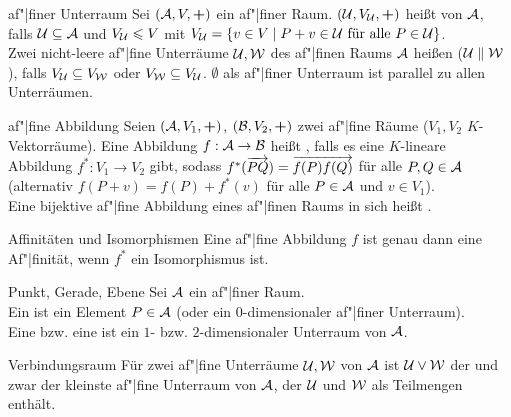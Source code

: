 \begin{Def}{af"|finer Unterraum}
    Sei $(\mathcal{A}, V, \boldsymbol{+})$ ein af"|finer Raum.
    $(\mathcal{U}, V_{\mathcal{U}}, \boldsymbol{+})$ heißt
     von $\mathcal{A}$, falls
    $\mathcal{U} \subseteq \mathcal{A}$ und $V_{\mathcal{U}} \leqslant V$ mit
    $V_{\mathcal{U}} = \{v \in V \;|\;
    P + v \in \mathcal{U} \text{ für alle } P \in \mathcal{U}\}$. \\
    Zwei nicht-leere af"|fine Unterräume $\mathcal{U}, \mathcal{W}$ des af"|finen 
    Raums $\mathcal{A}$ heißen 
    ($\mathcal{U} \parallel \mathcal{W}$),
    falls $V_{\mathcal{U}} \subseteq V_{\mathcal{W}}$ oder
    $V_{\mathcal{W}} \subseteq V_{\mathcal{U}}$.
    $\emptyset$ als af"|finer Unterraum ist parallel zu allen Unterräumen.
\end{Def}

\begin{Def}{af"|fine Abbildung}
    Seien $(\mathcal{A}, V_1, \boldsymbol{+})$,
    $(\mathcal{B}, V_2, \boldsymbol{+})$ zwei af"|fine Räume
    ($V_1, V_2$ $K$-Vektorräume).
    Eine Abbildung $f: \mathcal{A} \rightarrow \mathcal{B}$ heißt
    , falls es eine $K$-lineare Abbildung
    $f^\ast: V_1 \rightarrow V_2$ gibt,
    sodass $f^\ast(\overrightarrow{PQ}) = \overrightarrow{f(P) f(Q)}$ für alle
    $P, Q \in \mathcal{A}$ \\
    (alternativ $f(P + v) = f(P) + f^\ast(v)$ für alle
    $P \in \mathcal{A}$ und $v \in V_1$). \\
    Eine bijektive af"|fine Abbildung eines af"|finen Raums in sich heißt
    .
\end{Def}

\begin{Lemma}{Af{}finitäten und Isomorphismen}
    Eine af"|fine Abbildung $f$ ist genau dann eine Af"|finität, wenn
    $f^\ast$ ein Isomorphismus ist.
\end{Lemma}

\begin{Def}{Punkt, Gerade, Ebene}
    Sei $\mathcal{A}$ ein af"|finer Raum. \\
    Ein  ist ein Element $P \in \mathcal{A}$
    (oder ein $0$-dimensionaler af"|finer Unterraum). \\
    Eine  bzw. eine  ist ein $1$- bzw.
    $2$-dimensionaler Unterraum von $\mathcal{A}$.
\end{Def}

\begin{Def}{Verbindungsraum}
    Für zwei af"|fine Unterräume $\mathcal{U}, \mathcal{W}$ von $\mathcal{A}$ ist
    $\mathcal{U} \lor \mathcal{W}$ der  und zwar
    der kleinste af"|fine Unterraum von $\mathcal{A}$, der $\mathcal{U}$ und
    $\mathcal{W}$ als Teilmengen enthält.
\end{Def}

